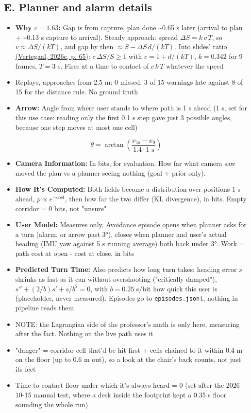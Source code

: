 \documentclass[a4paper]{article}
\begin{document}
\subsection{E. Planner and alarm details} \label{e-planner-and-alarm-details}
\begin{itemize}
	\item \textbf{Why $c = 1.63$:} Gap is from capture, plan done \textasciitilde 0.65 s later (arrival to plan + \textasciitilde 0.13 s capture to arrival). Steady approach: spread $\Delta S = k\,v\,T$, so $v \approx \Delta S/(kT)$, and gap by then $\approx S - \Delta S\,d/(kT)$. Into slides' ratio \hyperref[references]{(Vertegaal, 2026c, p. 65)}: $c\,\Delta S/S \ge 1$ with $c = 1 + d/(kT)$, $k = 0.342$ for 9 frames, $T = 3$ s. Fires at a time to contact of $c\,k\,T$ whatever the speed  
	\item Replays, approaches from 2.5 m: 0 missed, 3 of 15 warnings late against 8 of 15 for the distance rule. No ground truth
	\item \textbf{Arrow:} Angle from where user stands to where path is 1 s ahead (1 s, set for this use case: reading only the first 0.1 s step gave just 3 possible angles, because one step moves at most one cell)
\end{itemize}

  $$\theta = \arctan\!\left(\frac{x_{1\text{s}} - x_0}{1.4 \cdot 1\text{ s}}\right)$$

\begin{itemize}
	\item \textbf{Camera Information:} In bits, for evaluation. How far what camera saw moved the plan vs a planner seeing nothing (goal + prior only).  
	\item \textbf{How It's Computed:} Both fields become a distribution over positions 1 s ahead, $p \propto e^{-\text{cost}}$, then how far the two differ (KL divergence), in bits. Empty corridor = 0 bits, not "unsure"
	\item \textbf{User Model:} Measures only. Avoidance episode opens when planner asks for a turn (alarm, or arrow past 3°), closes when planner and user's actual heading (IMU yaw against 5 s running average) both back under 3°. Work = path cost at open - cost at close, in bits  
	\item \textbf{Predicted Turn Time:} Also predicts how long turn takes: heading error $s$ shrinks as fast as it can without overshooting ("critically damped"), $s'' + (2/b)s' + s/b^2 = 0$, with $b = 0.25$ s/bit how quick this user is (placeholder, never measured). Episodes go to \verb`episodes.jsonl`, nothing in pipeline reads them  
	\item NOTE: the Lagrangian side of the professor's math is only here, measuring after the fact. Nothing on the live path uses it
	\item "danger" = corridor cell that'd be hit first + cells chained to it within 0.4 m on the floor (up to 0.6 m out), so a look at the chair's back counts, not just its feet
	\item Time-to-contact floor under which it's always heard = 0 (set after the 2026-10-15 manual test, where a desk inside the footprint kept a 0.35 s floor sounding the whole run)
\end{itemize}
\end{document}
